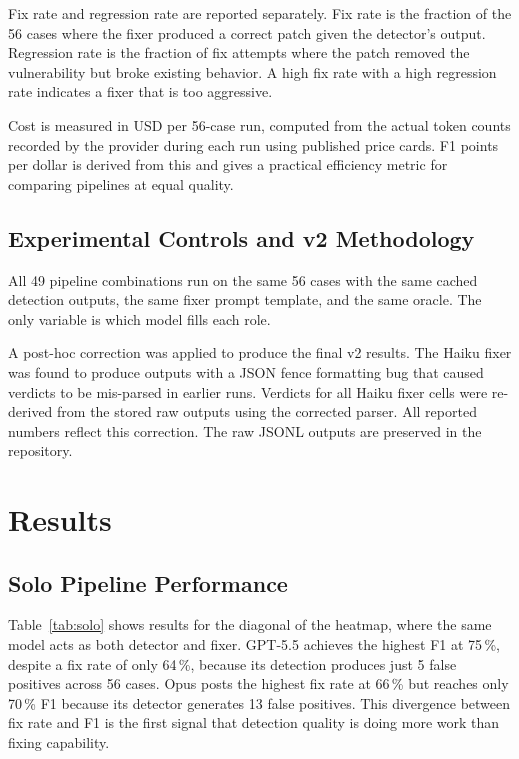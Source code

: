 \documentclass[12pt]{article}
\begin{document}
Fix rate and regression rate are reported separately. Fix rate is the
fraction of the 56 cases where the fixer produced a correct patch given the
detector's output. Regression rate is the fraction of fix attempts where the
patch removed the vulnerability but broke existing behavior. A high fix rate
with a high regression rate indicates a fixer that is too aggressive.

Cost is measured in USD per 56-case run, computed from the actual token
counts recorded by the provider during each run using published price cards.
F1 points per dollar is derived from this and gives a practical efficiency
metric for comparing pipelines at equal quality.

\subsection{Experimental Controls and v2 Methodology}

All 49 pipeline combinations run on the same 56 cases with the same cached
detection outputs, the same fixer prompt template, and the same oracle. The
only variable is which model fills each role.

A post-hoc correction was applied to produce the final v2 results. The Haiku
fixer was found to produce outputs with a JSON fence formatting bug that caused
verdicts to be mis-parsed in earlier runs. Verdicts for all Haiku fixer cells
were re-derived from the stored raw outputs using the corrected parser. All
reported numbers reflect this correction. The raw JSONL outputs are preserved
in the repository.

\section{Results}
\label{sec:results}

\subsection{Solo Pipeline Performance}

Table~\ref{tab:solo} shows results for the diagonal of the heatmap, where the
same model acts as both detector and fixer. GPT-5.5 achieves the highest F1 at
75\,\%, despite a fix rate of only 64\,\%, because its detection produces just
5 false positives across 56 cases. Opus posts the highest fix rate at 66\,\%
but reaches only 70\,\% F1 because its detector generates 13 false positives.
This divergence between fix rate and F1 is the first signal that detection
quality is doing more work than fixing capability.
\end{document}
